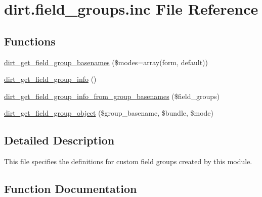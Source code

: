 \hypertarget{dirt_8field__groups_8inc}{}\section{dirt.\+field\+\_\+groups.\+inc File Reference}
\label{dirt_8field__groups_8inc}
\subsection*{Functions}
\begin{DoxyCompactItemize}
\item 
\mbox{\hyperlink{dirt_8field__groups_8inc_aebe241946b4cdcfebd57e57dae89dbd1}{dirt\+\_\+get\+\_\+field\+\_\+group\+\_\+basenames}} (\$modes=array(\textquotesingle{}form\textquotesingle{}, \textquotesingle{}default\textquotesingle{}))
\item 
\mbox{\hyperlink{dirt_8field__groups_8inc_ad57a6faa7b4f0fc6c40b2a9d19776ed2}{dirt\+\_\+get\+\_\+field\+\_\+group\+\_\+info}} ()
\item 
\mbox{\hyperlink{dirt_8field__groups_8inc_a537754b185bac30d8599a5fb2d0055e1}{dirt\+\_\+get\+\_\+field\+\_\+group\+\_\+info\+\_\+from\+\_\+group\+\_\+basenames}} (\$field\+\_\+groups)
\item 
\mbox{\hyperlink{dirt_8field__groups_8inc_ae0784b05afc41e0e23317d20c84c85ad}{dirt\+\_\+get\+\_\+field\+\_\+group\+\_\+object}} (\$group\+\_\+basename, \$bundle, \$mode)
\end{DoxyCompactItemize}


\subsection{Detailed Description}
This file specifies the definitions for custom field groups created by this module. 

\subsection{Function Documentation}
\mbox{\label{dirt_8field__groups_8inc_aebe241946b4cdcfebd57e57dae89dbd1}} 
